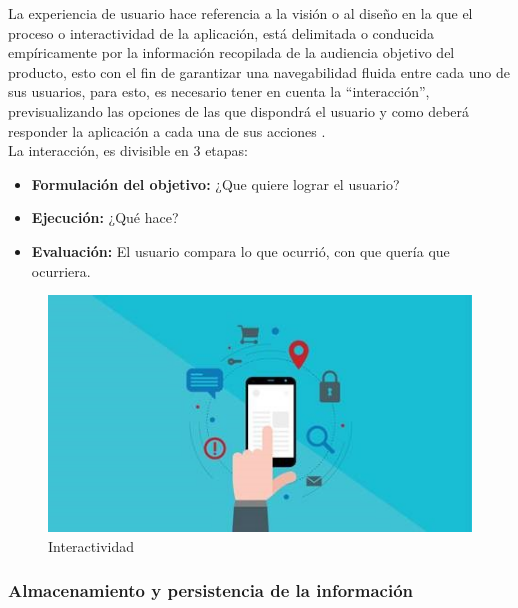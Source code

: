 		{La experiencia de usuario hace referencia a la visión o al diseño en la que el proceso o interactividad de la aplicación, está delimitada o conducida empíricamente por la información recopilada de la audiencia objetivo del producto, esto con el fin de garantizar una navegabilidad fluida entre cada uno de sus usuarios, para esto, es necesario tener en cuenta la “interacción”, previsualizando las opciones de las que dispondrá el usuario y como deberá responder la aplicación a cada una de sus acciones \cite{YusefUX}.\\
		
		La interacción, es divisible en 3 etapas:
		
		\begin{itemize}
			\item \textbf{Formulación del objetivo:} ¿Que quiere lograr el usuario?
			\item \textbf{Ejecución:} ¿Qué hace?
			\item \textbf{Evaluación:} El usuario compara lo que ocurrió, con que quería que ocurriera.
		\end{itemize}
		
		\begin{figure}[H]
			\centering
			\includegraphics[width=0.8\linewidth]{description/framework/interactividad.jpg}
			\caption{Interactividad}
		\end{figure}
		}
	
		\subsubsection{Almacenamiento y persistencia de la información}
		
